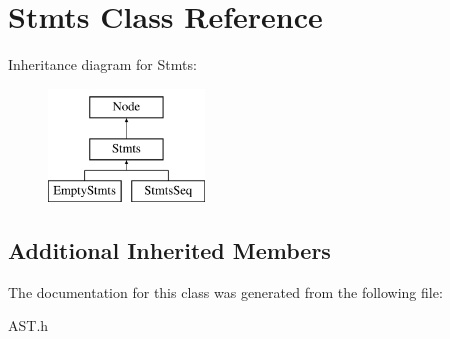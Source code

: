 \hypertarget{classStmts}{\section{Stmts Class Reference}
\label{classStmts}
}
Inheritance diagram for Stmts\-:\begin{figure}[H]
\begin{center}
\leavevmode
\includegraphics[height=3.000000cm]{classStmts}
\end{center}
\end{figure}
\subsection*{Additional Inherited Members}


The documentation for this class was generated from the following file\-:\begin{DoxyCompactItemize}
\item 
A\-S\-T.\-h\end{DoxyCompactItemize}
